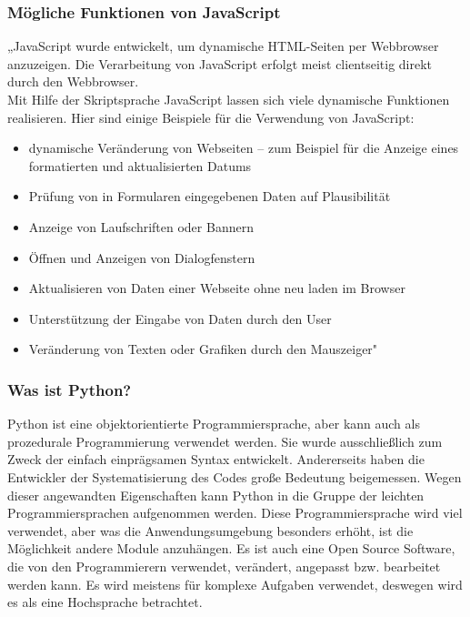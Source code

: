 \subsubsection{Mögliche Funktionen von JavaScript} 
„JavaScript wurde entwickelt, um dynamische HTML-Seiten per Webbrowser anzuzeigen. Die Verarbeitung von JavaScript erfolgt meist clientseitig direkt durch den Webbrowser. \\
Mit Hilfe der Skriptsprache JavaScript lassen sich viele dynamische Funktionen realisieren. Hier sind einige Beispiele für die Verwendung von JavaScript:
\begin{itemize}
	\item  dynamische Veränderung von Webseiten – zum Beispiel für die Anzeige eines formatierten und aktualisierten Datums
\end{itemize}
\begin{itemize}
	\item Prüfung von in Formularen eingegebenen Daten auf Plausibilität
\end{itemize}
\begin{itemize}
	\item Anzeige von Laufschriften oder Bannern
\end{itemize}
\begin{itemize}
	\item 	Öffnen und Anzeigen von Dialogfenstern
\end{itemize}
\begin{itemize}
	\item Aktualisieren von Daten einer Webseite ohne neu laden im Browser
\end{itemize}
\begin{itemize}
	\item 	Unterstützung der Eingabe von Daten durch den User
\end{itemize}
\begin{itemize}
	\item Veränderung von Texten oder Grafiken durch den Mauszeiger" \cite{50_javascript}
\end{itemize}
\subsubsection{Was ist Python?} 
Python ist eine objektorientierte Programmiersprache, aber kann auch als prozedurale Programmierung verwendet werden. Sie wurde ausschließlich zum Zweck der einfach einprägsamen Syntax entwickelt. Andererseits haben die Entwickler der Systematisierung des Codes große Bedeutung beigemessen. Wegen dieser angewandten Eigenschaften kann Python in die Gruppe der leichten Programmiersprachen aufgenommen werden. Diese Programmiersprache wird viel verwendet, aber was die Anwendungsumgebung besonders erhöht, ist die Möglichkeit andere Module anzuhängen. Es ist auch eine Open Source Software, die von den Programmierern verwendet, verändert, angepasst bzw. bearbeitet werden kann. Es wird meistens für komplexe Aufgaben verwendet, deswegen wird es als eine Hochsprache betrachtet. \cite{50_python}
